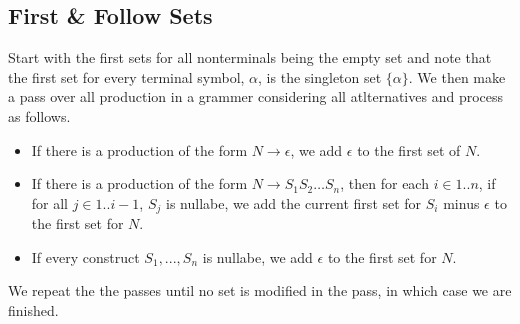 \subsection{First \& Follow Sets}
Start with the first sets for all nonterminals being the empty set and note that the first set for every terminal symbol, $\alpha$, is the singleton set $\{\alpha\}$.
We then make a pass over all production in a grammer considering all atlternatives and process as follows.
\begin{itemize}
    \item If there is a production of the form $N \rightarrow \epsilon$, we add $\epsilon$ to the first set of $N$.
    \item If there is a production of the form $N \rightarrow S_1 S_2 \dots S_n$, then for each $i \in 1..n$, if for all $j \in 1..i-1$, $S_j$ is nullabe, we add the current first set for $S_i$ minus $\epsilon$ to the first set for $N$.
    \item If every construct $S_1,...,S_n$ is nullabe, we add $\epsilon$ to the first set for $N$. 
\end{itemize}
We repeat the the passes until no set is modified in the pass, in which case we are finished.




